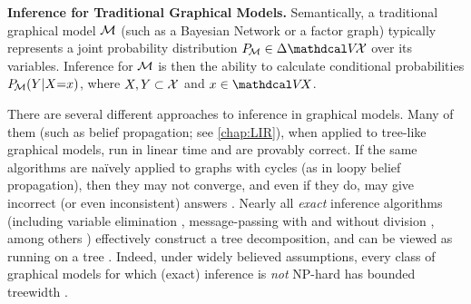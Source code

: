 \textbf{Inference for Traditional Graphical Models.}
Semantically, a traditional graphical model $\cal M$ (such as a Bayesian Network or a factor graph) typically represents a joint probability distribution $\Pr_{\!\cal M}
 \in \Delta \V\!\X$ over its variables.
Inference for $\cal M$ is then the ability to calculate conditional probabilities
 $\Pr_{\!\cal M}(Y|X{=}x)$,
where $X,Y \subset \X$ and $x \in \V\! X$. 

There are several different approaches to inference in graphical models.
%
Many of them (such as belief propagation; see \cref{chap:LIR}),
when applied to tree-like graphical models,
run in linear time and are provably correct.
If the same algorithms are na{\"i}vely applied to graphs with cycles (as in loopy belief propagation),
then they may not converge, and even if they do,
may give incorrect (or even inconsistent) answers
\parencite{wainwright2008graphical}.
Nearly all \emph{exact} inference algorithms
(including variable elimination  \parencite{bertele1972nonserial},
 message-passing with \parencite{lauritzen1988local}
    and without division \parencite{shafer1990probability},
    among others \parencite{wainwright2003tree})
effectively construct a tree decomposition, and can be
viewed as running on a tree \parencite[\S9-11]{KF09}.
Indeed,
under widely believed assumptions,
every class of graphical models
for which (exact) inference is \emph{not} NP-hard
has bounded treewidth
\parencite{chandrasekaran2012complexity}.

